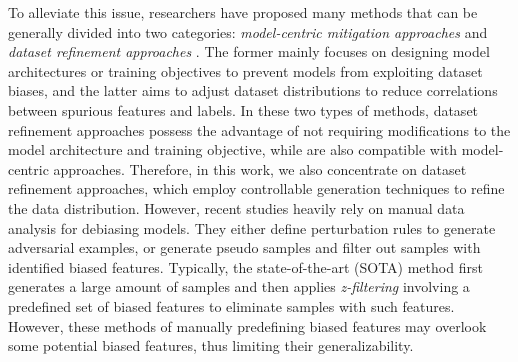 \documentclass[11pt]{article}
\begin{document}
To alleviate this issue, researchers have proposed many methods that can be generally divided into two categories: \textit{model-centric mitigation approaches} \cite{clark-etal-2019-dont,stacey-etal-2020-avoiding,utama-etal-2020-mind,karimi-mahabadi-etal-2020-end,du2021towards} and \textit{dataset refinement approaches} \cite{lee2021crossaug,wu2022generating,ross2022}. The former mainly focuses on designing model architectures or training objectives to prevent models from exploiting dataset biases, and the latter aims to adjust dataset distributions to reduce correlations between spurious features and labels. In these two types of methods, dataset refinement approaches possess the advantage of not requiring modifications to the model architecture and training objective, while are also compatible with model-centric approaches. Therefore, in this work, we also concentrate on dataset refinement approaches, which employ controllable generation techniques \cite{zhou2020exploring, hu2022controllable} to refine the data distribution.
However, recent studies \cite{lee2021crossaug,wu2022generating,ross2022} heavily rely on manual data analysis for debiasing models. They either define perturbation rules to generate adversarial examples, or generate pseudo samples and filter out samples with identified biased features. Typically, the state-of-the-art (SOTA) method \cite{wu2022generating} first generates a large amount of samples and then applies \textit{z-filtering} involving a predefined set of biased features to eliminate samples with such features. However, these methods of manually predefining biased features may overlook some potential biased features, thus limiting their generalizability.
\end{document}

